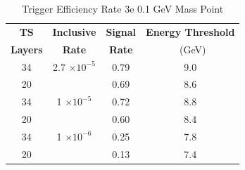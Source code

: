 \begin{table}
 \centering
\caption{Trigger Efficiency Rate 3e 0.1 GeV Mass Point}
\begin{tabular}{ c | c | c | c }
\textbf{TS} & \textbf{Inclusive} & \textbf{Signal} & \textbf{Energy Threshold}  \\ \textbf{Layers} & \textbf{Rate} & \textbf{Rate} & \ (GeV) \\ 
\hline
34 & 2.7 $\times 10^{-5}$ & 0.79 & 9.0 \\ 
20 & & 0.69 & 8.6 \\ 
\hline 
34 & 1 $\times 10^{-5}$ & 0.72 & 8.8 \\ 
20 & & 0.60 & 8.4 \\ 
\hline 
34 & 1 $\times 10^{-6}$ & 0.25 & 7.8 \\ 
20 & & 0.13 & 7.4 \\ 
\hline 
\end{tabular}
\end{table}
